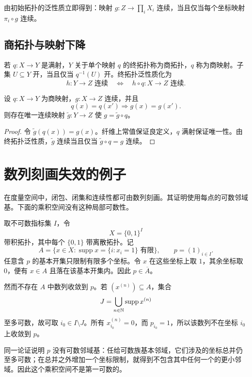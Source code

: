由初始拓扑的泛性质立即得到：映射 \(g:Z\to\prod_iX_i\) 连续，当且仅当每个坐标映射 \(\pi_i\circ g\) 连续。

\subsection{商拓扑与映射下降}

若 \(q:X\to Y\) 是满射，\(Y\) 关于单个映射 \(q\) 的终拓扑称为商拓扑，\(q\) 称为商映射。子集 \(U\subseteq Y\) 开，当且仅当 \(q^{-1}(U)\) 开。终拓扑泛性质化为
\[
 h:Y\to Z\text{ 连续}
 \quad\Longleftrightarrow\quad
 h\circ q:X\to Z\text{ 连续}.
\]

\begin{proposition}[商映射的下降]
\label{prop:quotient-map-descent}
设 \(q:X\to Y\) 为商映射，\(g:X\to Z\) 连续，并且
\[
 q(x)=q(x')\Longrightarrow g(x)=g(x').
\]
则存在唯一连续映射 \(\widetilde g:Y\to Z\) 使 \(g=\widetilde g\circ q\)。
\end{proposition}

\begin{proof}
令 \(\widetilde g(q(x))=g(x)\)。纤维上常值保证良定义，\(q\) 满射保证唯一性。由终拓扑泛性质，\(\widetilde g\) 连续当且仅当 \(\widetilde g\circ q=g\) 连续。
\end{proof}

\section{数列刻画失效的例子}

在度量空间中，闭包、闭集和连续性都可由数列刻画。其证明使用每点的可数邻域基。下面的乘积空间没有这种局部可数性。

\begin{example}[闭包中没有序列极限]
\label{ex:uncountable-product-sequential-failure}
取不可数指标集 \(I\)，令
\[
 X=\{0,1\}^{I}
\]
带积拓扑，其中每个 \(\{0,1\}\) 带离散拓扑。记
\[
 A=\{x\in X:\operatorname{supp}x=\{i:x_i=1\}\text{ 有限}\},
 \qquad p=(1)_{i\in I}.
\]
任意含 \(p\) 的基本开集只限制有限多个坐标。令 \(x\) 在这些坐标上取 \(1\)，其余坐标取 \(0\)，便有 \(x\in A\) 且落在该基本开集内。因此 \(p\in\overline A\)。

然而不存在 \(A\) 中数列收敛到 \(p\)。若 \((x^{(n)})\subseteq A\)，集合
\[
 J=\bigcup_{n\in\mathbb{N}}\operatorname{supp}x^{(n)}
\]
至多可数，故可取 \(i_0\in I\setminus J\)。所有 \(x^{(n)}_{i_0}=0\)，而 \(p_{i_0}=1\)，所以该数列不在坐标 \(i_0\) 上收敛到 \(p\)。
\end{example}

同一论证说明 \(p\) 没有可数邻域基：任给可数族基本邻域，它们涉及的坐标总并仍至多可数；在总并之外增加一个坐标限制，就得到不包含其中任何一个的更小邻域。因此这个乘积空间不是第一可数的。


